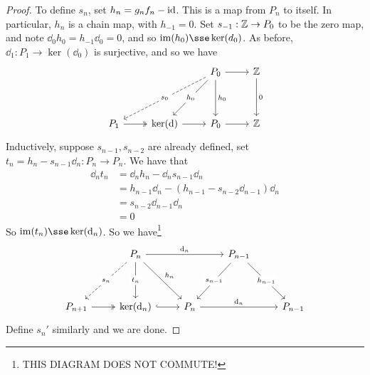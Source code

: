 \documentclass{article}
\begin{document}
\begin{proof}
    To define \(s_n\), set \(h_n = g_n f_n - \operatorname{id}\). This is a map from \(P_n\) to itself. In particular, \(h_n\) is a chain map, with \(h_{-1} = 0\). Set \(s_{-1} : \mathbb{Z} \to P_0\) to be the zero map, and note \(\dd_0 h_0 = h_{-1}\dd_0 =0\), and so \(\im(h_0) \sse \ker(d_0)\). As before, \(\dd_1 : P_1 \to \ker(\dd_0)\) is surjective, and so we have
\[\begin{tikzcd}
	&& {P_0} & \Z \\
	\\
	{P_1} & {\ker(\dd)} & {P_0} & \Z
	\arrow["{h_0}", from=1-3, to=3-3]
	\arrow["0", from=1-4, to=3-4]
	\arrow[from=1-3, to=1-4]
	\arrow[from=3-3, to=3-4]
	\arrow[from=3-2, to=3-3]
	\arrow["{h_0}"{description}, from=1-3, to=3-2]
	\arrow[two heads, from=3-1, to=3-2]
	\arrow["{s_0}"{description}, dashed, from=1-3, to=3-1]
\end{tikzcd}\]
    Inductively, suppose \(s_{n-1}, s_{n-2}\) are already defined, set \(t_n = h_n - s_{n-1}\dd_n : P_n \to P_n\). We have that 
    \begin{align*}
        \dd_n t_n &= \dd_n h_n - \dd_n s_{n-1}\dd_n \\
        &= h_{n-1}\dd_n - (h_{n-1} - s_{n-2}\dd_{n-1})\dd_n \\
        &= s_{n-2}\dd_{n-1}\dd_n\\
        &= 0
    \end{align*}
    So \(\im(t_n) \sse \ker(\dd_n)\). So we have\footnote{THIS DIAGRAM DOES NOT COMMUTE!}
\[\begin{tikzcd}
	& {P_n} && {P_{n-1}} \\
	\\
	{P_{n+1}} & {\ker(\dd_n)} & {P_n} && {P_{n-1}}
	\arrow["{\dd_n}", from=1-2, to=1-4]
	\arrow["{\dd_n}", from=3-3, to=3-5]
	\arrow[two heads, from=3-1, to=3-2]
	\arrow[hook, from=3-2, to=3-3]
	\arrow["{h_n}", from=1-2, to=3-3]
	\arrow["{h_{n-1}}"{description}, from=1-4, to=3-5]
	\arrow["{s_{n-1}}"{description}, from=1-4, to=3-3]
	\arrow["{t_n}"{description}, from=1-2, to=3-2]
	\arrow["{s_n}"{description}, dashed, from=1-2, to=3-1]
\end{tikzcd}\]
    Define \(s_n'\) similarly and we are done.
\end{proof}
\end{document}
